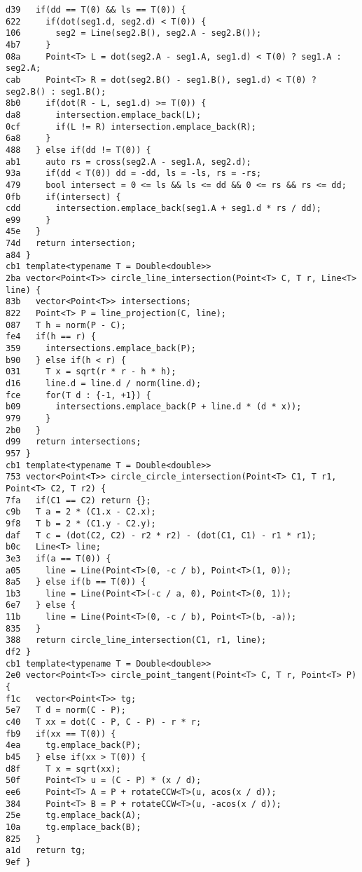 \documentclass[10pt, a4paper, twoside]{article}
\begin{document}
\begin{lstlisting}
d39   if(dd == T(0) && ls == T(0)) {
622     if(dot(seg1.d, seg2.d) < T(0)) {
106       seg2 = Line(seg2.B(), seg2.A - seg2.B());
4b7     }
08a     Point<T> L = dot(seg2.A - seg1.A, seg1.d) < T(0) ? seg1.A : seg2.A;
cab     Point<T> R = dot(seg2.B() - seg1.B(), seg1.d) < T(0) ? seg2.B() : seg1.B();
8b0     if(dot(R - L, seg1.d) >= T(0)) {
da8       intersection.emplace_back(L);
0cf       if(L != R) intersection.emplace_back(R);
6a8     }
488   } else if(dd != T(0)) {
ab1     auto rs = cross(seg2.A - seg1.A, seg2.d);
93a     if(dd < T(0)) dd = -dd, ls = -ls, rs = -rs;
479     bool intersect = 0 <= ls && ls <= dd && 0 <= rs && rs <= dd;
0fb     if(intersect) {
cdd       intersection.emplace_back(seg1.A + seg1.d * rs / dd);
e99     }
45e   }
74d   return intersection;
a84 }
cb1 template<typename T = Double<double>>
2ba vector<Point<T>> circle_line_intersection(Point<T> C, T r, Line<T> line) {
83b   vector<Point<T>> intersections;
822   Point<T> P = line_projection(C, line);
087   T h = norm(P - C);
fe4   if(h == r) {
359     intersections.emplace_back(P);
b90   } else if(h < r) {
031     T x = sqrt(r * r - h * h);
d16     line.d = line.d / norm(line.d);
fce     for(T d : {-1, +1}) {
b09       intersections.emplace_back(P + line.d * (d * x));
979     }
2b0   }
d99   return intersections;
957 }
cb1 template<typename T = Double<double>>
753 vector<Point<T>> circle_circle_intersection(Point<T> C1, T r1, Point<T> C2, T r2) {
7fa   if(C1 == C2) return {};  
c9b   T a = 2 * (C1.x - C2.x);
9f8   T b = 2 * (C1.y - C2.y);
daf   T c = (dot(C2, C2) - r2 * r2) - (dot(C1, C1) - r1 * r1);
b0c   Line<T> line;
3e3   if(a == T(0)) {
a05     line = Line(Point<T>(0, -c / b), Point<T>(1, 0)); 
8a5   } else if(b == T(0)) {
1b3     line = Line(Point<T>(-c / a, 0), Point<T>(0, 1));
6e7   } else {
11b     line = Line(Point<T>(0, -c / b), Point<T>(b, -a));
835   }
388   return circle_line_intersection(C1, r1, line);
df2 }
cb1 template<typename T = Double<double>>
2e0 vector<Point<T>> circle_point_tangent(Point<T> C, T r, Point<T> P) {
f1c   vector<Point<T>> tg;
5e7   T d = norm(C - P);
c40   T xx = dot(C - P, C - P) - r * r;
fb9   if(xx == T(0)) {
4ea     tg.emplace_back(P);
b45   } else if(xx > T(0)) {
d8f     T x = sqrt(xx);
50f     Point<T> u = (C - P) * (x / d);
ee6     Point<T> A = P + rotateCCW<T>(u, acos(x / d));
384     Point<T> B = P + rotateCCW<T>(u, -acos(x / d));
25e     tg.emplace_back(A);
10a     tg.emplace_back(B);
825   }
a1d   return tg;
9ef }
\end{lstlisting}
\end{document}
